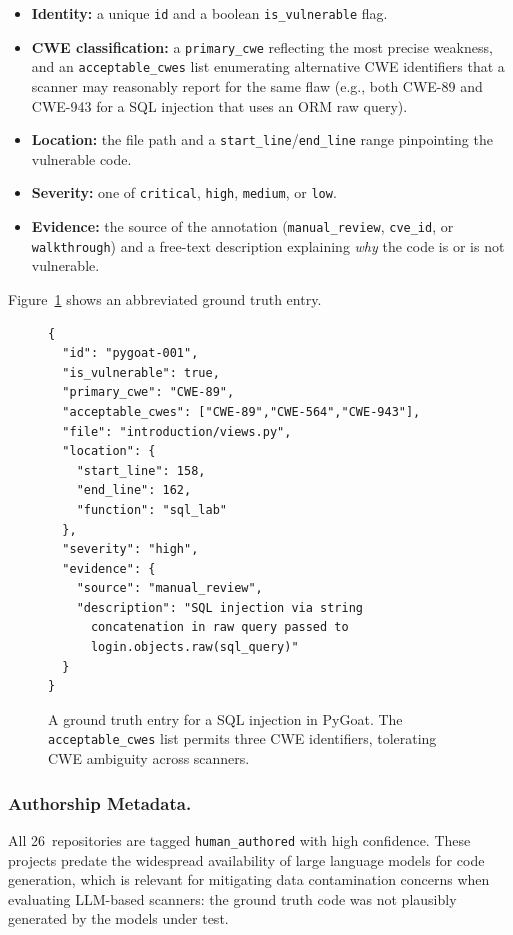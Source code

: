 \begin{itemize}
  \item \textbf{Identity:} a unique \texttt{id} and a boolean \texttt{is\_vulnerable} flag.
  \item \textbf{CWE classification:} a \texttt{primary\_cwe} reflecting the most precise weakness, and an \texttt{acceptable\_cwes} list enumerating alternative CWE identifiers that a scanner may reasonably report for the same flaw (e.g., both CWE-89 and CWE-943 for a SQL injection that uses an ORM raw query).
  \item \textbf{Location:} the file path and a \texttt{start\_line}/\texttt{end\_line} range pinpointing the vulnerable code.
  \item \textbf{Severity:} one of \texttt{critical}, \texttt{high}, \texttt{medium}, or \texttt{low}.
  \item \textbf{Evidence:} the source of the annotation (\texttt{manual\_review}, \texttt{cve\_id}, or \texttt{walkthrough}) and a free-text description explaining \emph{why} the code is or is not vulnerable.
\end{itemize}

\noindent
Figure~\ref{fig:gt-entry} shows an abbreviated ground truth entry.

\begin{figure}[t]
\begin{verbatim}
{
  "id": "pygoat-001",
  "is_vulnerable": true,
  "primary_cwe": "CWE-89",
  "acceptable_cwes": ["CWE-89","CWE-564","CWE-943"],
  "file": "introduction/views.py",
  "location": {
    "start_line": 158,
    "end_line": 162,
    "function": "sql_lab"
  },
  "severity": "high",
  "evidence": {
    "source": "manual_review",
    "description": "SQL injection via string
      concatenation in raw query passed to
      login.objects.raw(sql_query)"
  }
}
\end{verbatim}
\caption{A ground truth entry for a SQL injection in PyGoat. The \texttt{acceptable\_cwes} list permits three CWE identifiers, tolerating CWE ambiguity across scanners.}
\label{fig:gt-entry}
\end{figure}

\subsubsection{Authorship Metadata.}
All 26~repositories are tagged \texttt{human\_authored} with high confidence.
These projects predate the widespread availability of large language models for code generation, which is relevant for mitigating data contamination concerns when evaluating LLM-based scanners: the ground truth code was not plausibly generated by the models under test.

